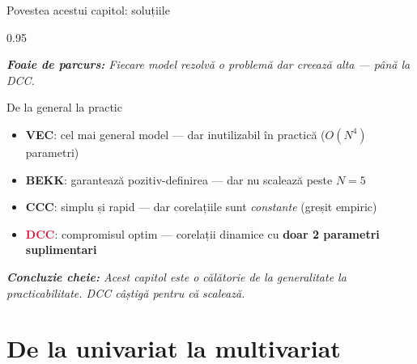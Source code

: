 \documentclass[9pt, aspectratio=169, t]{beamer}
\begin{document}
\begin{frame}{Povestea acestui capitol: soluțiile}
    \begin{cminipage}{0.95\textwidth}
    {\footnotesize
    \textit{\textbf{Foaie de parcurs:} Fiecare model rezolvă o problemă dar creează alta --- până la DCC.}
    \vspace{0.2cm}
    \begin{block}{De la general la practic}
        \begin{itemize}\setlength{\itemsep}{4pt}
            \item \textbf{VEC}: cel mai general model --- dar inutilizabil în practică ($O(N^4)$ parametri)
            \item \textbf{BEKK}: garantează pozitiv-definirea --- dar nu scalează peste $N = 5$
            \item \textbf{CCC}: simplu și rapid --- dar corelațiile sunt \textit{constante} (greșit empiric)
            \item \textcolor{Crimson}{\textbf{DCC}}: compromisul optim --- corelații dinamice cu \textbf{doar 2 parametri suplimentari}
        \end{itemize}
    \end{block}
    \vspace{0.2cm}
    \textit{\textbf{Concluzie cheie:} Acest capitol este o călătorie de la generalitate la practicabilitate. DCC câștigă pentru că scalează.}
    }
    \end{cminipage}
\end{frame}

\section{De la univariat la multivariat}
\end{document}
